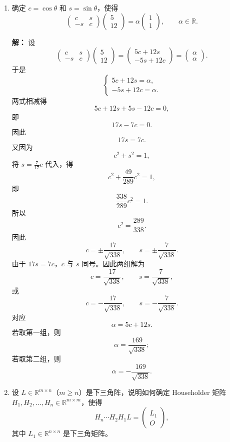 \documentclass[11pt]{article}
\newcommand{\R}{\mathbb{R}}
\newenvironment{solution}{\par\noindent\textbf{解：}}{\par}
\begin{document}
\begin{enumerate}
\item 确定 \(c=\cos\theta\) 和 \(s=\sin\theta\)，使得
\[
\begin{pmatrix}
c&s\\
-s&c
\end{pmatrix}
\begin{pmatrix}
5\\
12
\end{pmatrix}
=
\alpha
\begin{pmatrix}
1\\
1
\end{pmatrix},
\qquad \alpha\in\R.
\]

\begin{solution}
设
\[
\begin{pmatrix}
c&s\\
-s&c
\end{pmatrix}
\begin{pmatrix}
5\\
12
\end{pmatrix}
=
\begin{pmatrix}
5c+12s\\
-5s+12c
\end{pmatrix}
=
\begin{pmatrix}
\alpha\\
\alpha
\end{pmatrix}.
\]
于是
\[
\begin{cases}
5c+12s=\alpha,\\
-5s+12c=\alpha.
\end{cases}
\]
两式相减得
\[
5c+12s+5s-12c=0,
\]
即
\[
17s-7c=0.
\]
因此
\[
17s=7c.
\]
又因为
\[
c^2+s^2=1,
\]
将 \(s=\frac{7}{17}c\) 代入，得
\[
c^2+\frac{49}{289}c^2=1,
\]
即
\[
\frac{338}{289}c^2=1.
\]
所以
\[
c^2=\frac{289}{338}.
\]
因此
\[
c=\pm \frac{17}{\sqrt{338}},\qquad
s=\pm \frac{7}{\sqrt{338}}.
\]
由于 \(17s=7c\)，\(c\) 与 \(s\) 同号。因此两组解为
\[
\boxed{
c=\frac{17}{\sqrt{338}},\qquad
s=\frac{7}{\sqrt{338}},
}
\]
或
\[
\boxed{
c=-\frac{17}{\sqrt{338}},\qquad
s=-\frac{7}{\sqrt{338}}.
}
\]
对应
\[
\alpha=5c+12s.
\]
若取第一组，则
\[
\alpha=\frac{169}{\sqrt{338}};
\]
若取第二组，则
\[
\alpha=-\frac{169}{\sqrt{338}}.
\]
\end{solution}

\item 设 \(L\in\R^{m\times n}\)（\(m\geqslant n\)）是下三角阵，说明如何确定 Householder 矩阵
\(H_1,H_2,\dots,H_n\in\R^{m\times m}\)，使得
\[
H_n\cdots H_2H_1L=
\begin{pmatrix}
L_1\\
O
\end{pmatrix},
\]
其中 \(L_1\in\R^{n\times n}\) 是下三角矩阵。


\end{enumerate}
\end{document}
